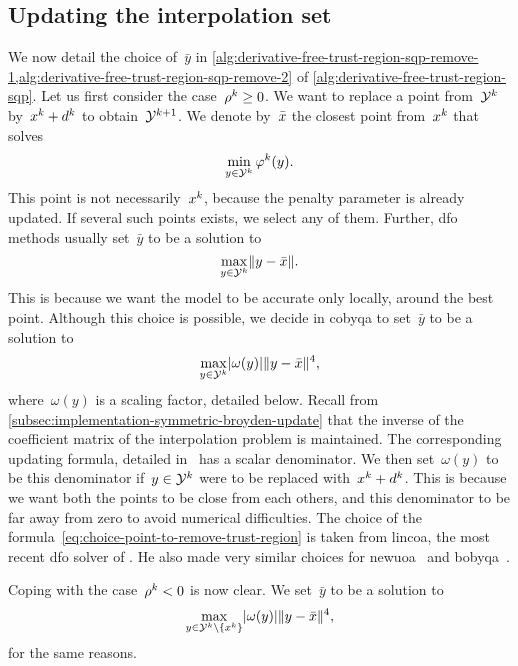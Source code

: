 \subsection{Updating the interpolation set}

We now detail the choice of~$\bar{y}$ in \cref{alg:derivative-free-trust-region-sqp-remove-1,alg:derivative-free-trust-region-sqp-remove-2} of \cref{alg:derivative-free-trust-region-sqp}.
Let us first consider the case~$\ratio[k] \ge 0$.
We want to replace a point from~$\xpt[k]$ by~$\iter[k] + \step[k]$ to obtain~$\xpt[k + 1]$.
We denote by~$\bar{\iter}$ the closest point from~$\iter[k]$ that solves
\begin{equation*}
    \min_{y \in \xpt[k]} \merit[k](y).
\end{equation*}
This point is not necessarily~$\iter[k]$, because the penalty parameter is already updated.
If several such points exists, we select any of them.
Further, \gls{dfo} methods usually set~$\bar{y}$ to be a solution to
\begin{equation*}
    \max_{y \in \xpt[k]} \norm{y - \bar{\iter}}.
\end{equation*}
This is because we want the model to be accurate only locally, around the best point.
Although this choice is possible, we decide in \gls{cobyqa} to set~$\bar{y}$ to be a solution to
\begin{equation}
    \label{eq:choice-point-to-remove-trust-region}
    \max_{y \in \xpt[k]} \abs{\omega(y)} \norm{y - \bar{\iter}}^4,
\end{equation}
where~$\omega(y)$ is a scaling factor, detailed below.
Recall from \cref{subsec:implementation-symmetric-broyden-update} that the inverse of the coefficient matrix of the interpolation problem is maintained.
The corresponding updating formula, detailed in~\cite[Eq.~(2.12)]{Powell_2004c} has a scalar denominator.
We then set~$\omega(y)$ to be this denominator if~$y \in \xpt[k]$ were to be replaced with~$\iter[k] + \step[k]$.
This is because we want both the points to be close from each others, and this denominator to be far away from zero to avoid numerical difficulties.
The choice of the formula~\cref{eq:choice-point-to-remove-trust-region} is taken from \gls{lincoa}, the most recent \gls{dfo} solver of \citeauthor{Powell_2015}.
He also made very similar choices for \gls{newuoa}~\cite[Eq.~(7.4)]{Powell_2006} and \gls{bobyqa}~\cite[Eq.~(6.1)]{Powell_2009}.

Coping with the case~$\ratio[k] < 0$ is now clear.
We set~$\bar{y}$ to be a solution to
\begin{equation*}
    \max_{y \in \xpt[k] \setminus \set{\iter[k]}} \abs{\omega(y)} \norm{y - \bar{\iter}}^4,
\end{equation*}
for the same reasons.

